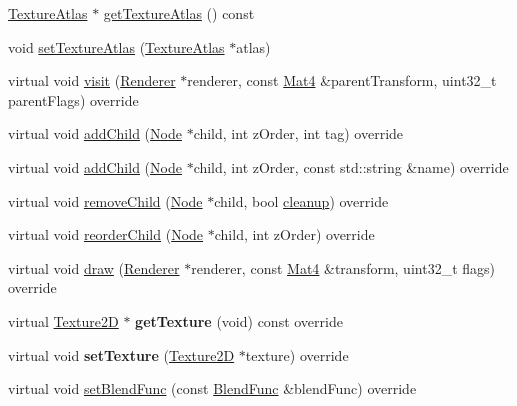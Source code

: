 \begin{DoxyCompactItemize}
\hyperlink{classTextureAtlas}{Texture\+Atlas} $\ast$ \hyperlink{classParticleBatchNode_a815bf8adf7dc63a80730136e527bcf46}{get\+Texture\+Atlas} () const
\item 
void \hyperlink{classParticleBatchNode_a67fa60ccb7be07438228ea461682a483}{set\+Texture\+Atlas} (\hyperlink{classTextureAtlas}{Texture\+Atlas} $\ast$atlas)
\item 
virtual void \hyperlink{classParticleBatchNode_af1dd3c3d3e8d7d17d0b1b00d634eb434}{visit} (\hyperlink{classRenderer}{Renderer} $\ast$renderer, const \hyperlink{classMat4}{Mat4} \&parent\+Transform, uint32\+\_\+t parent\+Flags) override
\item 
virtual void \hyperlink{classParticleBatchNode_aeaefc79b9a891df138679763791b5ac1}{add\+Child} (\hyperlink{classNode}{Node} $\ast$child, int z\+Order, int tag) override
\item 
virtual void \hyperlink{classParticleBatchNode_a3d8673da7a4d50a9b8a825a7be13ff88}{add\+Child} (\hyperlink{classNode}{Node} $\ast$child, int z\+Order, const std\+::string \&name) override
\item 
virtual void \hyperlink{classParticleBatchNode_a384b404f2f29463180517528f6f350dc}{remove\+Child} (\hyperlink{classNode}{Node} $\ast$child, bool \hyperlink{classNode_aa2de84c6cdeec9cd647d236c30ee0567}{cleanup}) override
\item 
virtual void \hyperlink{classParticleBatchNode_ab872c436a2cb7058f589aa7d16bcdd06}{reorder\+Child} (\hyperlink{classNode}{Node} $\ast$child, int z\+Order) override
\item 
virtual void \hyperlink{classParticleBatchNode_a780eb41e700d1c44f07dcca694431567}{draw} (\hyperlink{classRenderer}{Renderer} $\ast$renderer, const \hyperlink{classMat4}{Mat4} \&transform, uint32\+\_\+t flags) override
\item 
\mbox{\label{classParticleBatchNode_a0a5c959725846212945dc3ec9085ac1c}} 
virtual \hyperlink{classTexture2D}{Texture2D} $\ast$ {\bfseries get\+Texture} (void) const override
\item 
\mbox{\label{classParticleBatchNode_a90fa21090f0ed128f9798f71ee085427}} 
virtual void {\bfseries set\+Texture} (\hyperlink{classTexture2D}{Texture2D} $\ast$texture) override
\item 
virtual void \hyperlink{classParticleBatchNode_aa5f56df9acedf2a1446f63e93637126b}{set\+Blend\+Func} (const \hyperlink{structBlendFunc}{Blend\+Func} \&blend\+Func) override

\end{DoxyCompactItemize}
